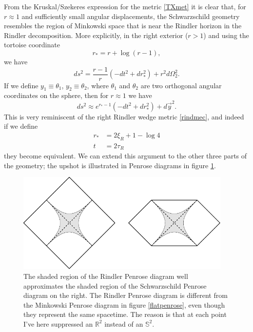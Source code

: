 \documentclass[12pt]{article}
\newcommand{\be}{\begin{equation}}
\newcommand{\ee}{\end{equation}}
\begin{document}
From the Kruskal/Szekeres expression for the metric \eqref{TXmet} it is clear that, for $r\approx 1$ and sufficiently small angular displacements, the Schwarzschild geometry resembles the region of Minkowski space that is near the Rindler horizon in the Rindler decomposition.  More explicitly, in the right exterior ($r>1$) and using the tortoise coordinate 
\be
r_*=r+\log (r-1),
\ee
we have
\be
ds^2=\frac{r-1}{r}\left(-dt^2+dr_*^2\right)+r^2 d\Omega_2^2.
\ee
If we define $y_1\equiv \theta_1$, $y_2\equiv \theta_2$, where $\theta_1$ and $\theta_2$ are two orthogonal angular coordinates on the sphere, then for $r\approx 1$ we have
\be
ds^2\approx e^{r_*-1}\left(-dt^2+dr_*^2\right)+d\vec{y}^2.
\ee
This is very reminiscent of the right Rindler wedge metric \eqref{rindmec}, and indeed if we define 
\begin{align}\nonumber
r_*&=2\xi_R+1-\log 4\\
t&=2\tau_R \label{rindschc}
\end{align}
they become equivalent.  We can extend this argument to the other three parts of the geometry; the upshot is illustrated in Penrose diagrams in figure \ref{rindsch}.
\begin{figure}
\begin{center}
\includegraphics[height=5cm]{rindsch.pdf}
\caption{The shaded region of the Rindler Penrose diagram well approximates the shaded region of the Schwarzschild Penrose diagram on the right.  The Rindler Penrose diagram is different from the Minkowski Penrose diagram in figure \ref{flatpenrose}, even though they represent the same spacetime.  The reason is that at each point I've here suppressed an $\mathbb{R}^2$ instead of an $\mathbb{S}^2$.}\label{rindsch}
\end{center}
\end{figure}
\end{document}
